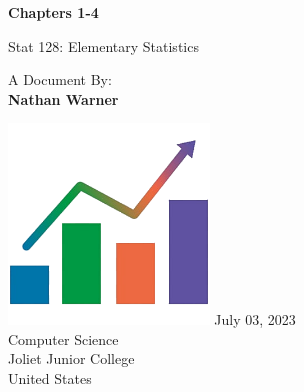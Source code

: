\documentclass{report}
\title{\Huge{}}
\author{\huge{Nathan Warner}}
\date{\huge{}}
\begin{document}
        \begin{titlepage}
       \begin{center}
           \vspace*{1cm}
    
           \textbf{Chapters 1-4}
    
           \vspace{0.5cm}
           Stat 128: Elementary Statistics
            
                
           \vspace{1.5cm}
   
           A Document By: \\
           \textbf{Nathan Warner}
    
           \vfill
                
                
           \vspace{0.8cm}
         
           \includegraphics[width=0.4\textwidth]{./figures/2.png}
           \bigbreak \noindent 
            July 03, 2023  \\
           Computer Science \\
           Joliet Junior College \\
           United States\\
           
                
       \end{center}
    \end{titlepage}
    \tableofcontents
    \pagebreak \bigbreak \noindent
\end{document}

